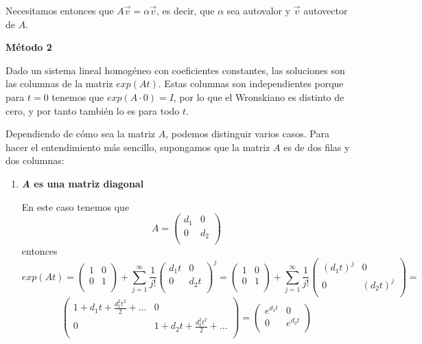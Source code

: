 \documentclass{mathnotes}
\begin{document}
Necesitamos entonces que $A\vec{v} = \alpha\vec{v}$, es decir, que $\alpha$ sea autovalor y $\vec{v}$ autovector de $A$.

\vspace{5mm}
\noindent\textbf{Método 2}

Dado un sistema lineal homogéneo con coeficientes constantes, las soluciones son las columnas de la matriz $exp(At)$. Estas columnas son independientes porque para $t=0$ tenemos que $exp(A\cdot0) = I$, por lo que el Wronskiano es distinto de cero, y por tanto también lo es para todo $t$.

Dependiendo de cómo sea la matriz $A$, podemos distinguir varios casos. Para hacer el entendimiento más sencillo, supongamos que la matriz $A$ es de dos filas y dos columnas:

\begin{enumerate}
\item \textbf{\textit{A} es una matriz diagonal}

En este caso tenemos que $$A = \begin{pmatrix}
d_1 & 0\\0 & d_2\\
\end{pmatrix}$$
entonces $$exp(At) = \begin{pmatrix}
1 & 0\\ 0 & 1\\
\end{pmatrix} + \sum_{j=1}^\infty \frac{1}{j!} \begin{pmatrix}
d_1t & 0\\ 0 & d_2t\\
\end{pmatrix}^j = \begin{pmatrix}
1 & 0\\ 0 & 1\\
\end{pmatrix} + \sum_{j=1}^\infty \frac{1}{j!} \begin{pmatrix}
(d_1t)^j & 0\\ 0 & (d_2t)^j\\
\end{pmatrix} = $$
$$\begin{pmatrix}
1+d_1t+\frac{d_1^2t^2}{2}+\hdots & 0\\
0 & 1+d_2t+\frac{d_2^2t^2}{2}+\hdots\\
\end{pmatrix} = \begin{pmatrix}
e^{d_1t} & 0\\ 0 & e^{d_2t}\\
\end{pmatrix}$$


\end{enumerate}
\end{document}
